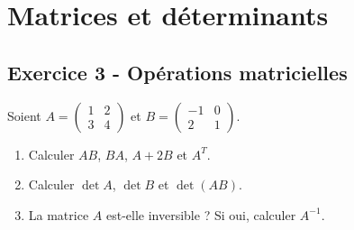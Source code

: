 \documentclass[12pt,a4paper]{article}
\begin{document}
\section{Matrices et déterminants}

\subsection*{Exercice 3 - Opérations matricielles \niveau{\facile}}

\begin{boiteexercice}
Soient $A = \begin{pmatrix}1&2\\3&4\end{pmatrix}$ et $B = \begin{pmatrix}-1&0\\2&1\end{pmatrix}$.
\begin{enumerate}
  \item Calculer $AB$, $BA$, $A+2B$ et $A^T$.
  \item Calculer $\det A$, $\det B$ et $\det(AB)$.
  \item La matrice $A$ est-elle inversible ? Si oui, calculer $A^{-1}$.
\end{enumerate}
\end{boiteexercice}
\end{document}
